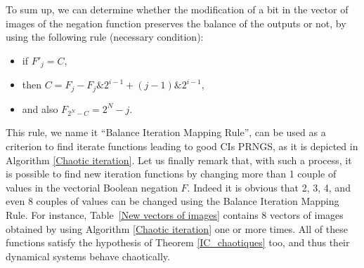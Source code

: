 To sum up, we can determine whether the modification of a bit in the vector of images of the negation function preserves the balance of the outputs or not, by using the following rule (necessary condition):
\begin{itemize}
\item if $F'_j = C$,
\item then $C = F_j-F_j\&2^{i-1}+(j-1)\&2^{i-1}$,
\item and also $F_{2^N-C} = 2^N-j$.
\end{itemize}

This rule, we name it ``Balance Iteration Mapping Rule'', can be used as a criterion to find iterate functions leading to good CIs PRNGS, as it is depicted in Algorithm \ref{Chaotic iteration}.
Let us finally remark that, with such a process, it is possible to find new iteration functions by changing more than 1 couple of values in the vectorial Boolean negation $F$. Indeed it is obvious that 2, 3, 4, and even 8 couples of values can be changed using the Balance Iteration Mapping Rule.
For instance, Table~\ref{New vectors of images} contains 8 vectors of images obtained by using Algorithm \ref{Chaotic iteration} one or more times. All of these functions satisfy the hypothesis of Theorem \ref{IC_chaotiques} too, and thus their dynamical systems behave chaotically.



